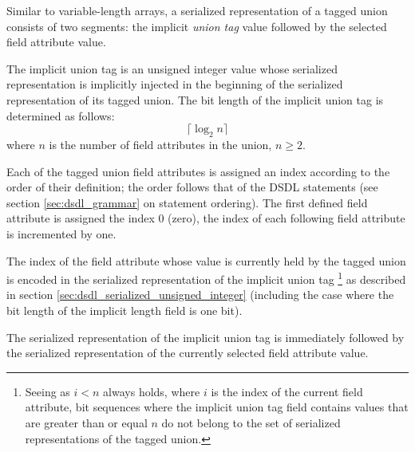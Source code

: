 Similar to variable-length arrays, a serialized representation of a tagged union consists of two segments:
the implicit \emph{union tag} value followed by the selected field attribute value.

The implicit union tag is an unsigned integer value whose serialized representation
is implicitly injected in the beginning of the serialized representation of its tagged union.
The bit length of the implicit union tag is determined as follows:
$$\lceil{}\log_2 n\rceil{}$$
where $n$ is the number of field attributes in the union, $n \geq 2$.

Each of the tagged union field attributes is assigned an index according to the order of their definition;
the order follows that of the DSDL statements (see section \ref{sec:dsdl_grammar} on statement ordering).
The first defined field attribute is assigned the index 0 (zero),
the index of each following field attribute is incremented by one.

The index of the field attribute whose value is currently held by the tagged union is encoded
in the serialized representation of the implicit union tag%
\footnote{%
    Seeing as $i < n$ always holds, where $i$ is the index of the current field attribute,
    bit sequences where the implicit union tag field contains values
    that are greater than or equal $n$ do not belong to the set of serialized representations of the tagged union.
}
as described in section \ref{sec:dsdl_serialized_unsigned_integer}
(including the case where the bit length of the implicit length field is one bit).

The serialized representation of the implicit union tag is immediately followed by
the serialized representation of the currently selected field attribute value.

